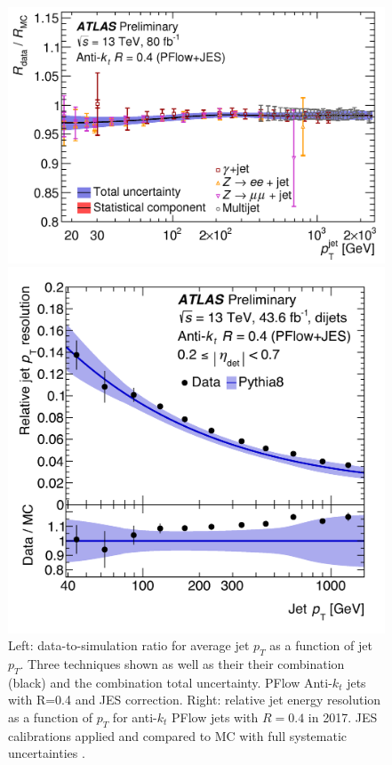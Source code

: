 \begin{figure}[!h]
    \centering
  \begin{minipage}[b]{0.5\textwidth}
  \includegraphics[width=\textwidth]{Pictures/ParticleFlowScale.png}
  \end{minipage}
  \hspace{.5cm}
  \begin{minipage}[b]{0.4\textwidth}
    \includegraphics[width=\textwidth]{Pictures/ParticleFlowResolution.png}
  \end{minipage}
    \caption{ Left: data-to-simulation ratio for average jet $p_T$ as a function of jet $p_T$. Three techniques shown as well as their their combination (black) and the combination total uncertainty. PFlow Anti-$k_t$ jets with R=0.4 and JES correction. Right: relative jet energy resolution as a function of $p_T$ for anti-$k_t$ PFlow jets with $R=0.4$ in 2017. JES calibrations applied and compared to MC with full systematic uncertainties \cite{JETEtmiss}.}
    \label{fig:ScaleRes}
\end{figure}

